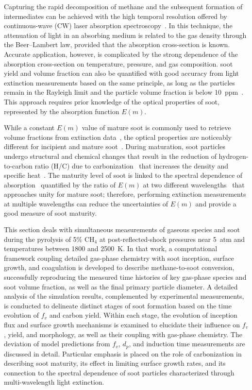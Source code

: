Capturing the rapid decomposition of methane and the subsequent formation of intermediates can be achieved with the high temporal resolution offered by continuous-wave (CW) laser absorption spectroscopy~\citep{pinkowski2019multi}. In this technique, the attenuation of light in an absorbing medium is related to the gas density through the Beer–Lambert law, provided that the absorption cross-section is known. Accurate application, however, is complicated by the strong dependence of the absorption cross-section on temperature, pressure, and gas composition. soot yield and volume fraction can also be quantified with good accuracy from light extinction measurements based on the same principle, as long as the particles remain in the Rayleigh limit and the particle volume fraction is below 10~ppm~\citep{eremin2012formation}. This approach requires prior knowledge of the optical properties of soot, represented by the absorption function $E(m)$. 

While a constant $E(m)$ value of mature soot is commonly used to retrieve volume fractions from extinction data~\citep{de2008scattering, agafonov2016unified, utsav2017simultaneous}, the optical properties are noticeably different for incipient and mature soot~\citep{michelsen2021effects}. During maturation, soot particles undergo structural and chemical changes that result in the reduction of hydrogen-to-carbon ratio (H/C) due to carbonization~\cite{kholghy2016core} that increases the density and specific heat~\citep{michelsen2021effects}. The maturity level of soot is linked to the spectral dependence of absorption~\citep{bescond2016soot} quantified by the ratio of $E(m)$ at two different wavelengths~\citep{yon2021revealing} that approaches unity for mature soot; therefore, performing extinction measurements at multiple wavelengths can reduce the uncertainties of $E(m)$ and provide a good measure of soot maturity.


This section deals with simultaneous measurements of gaseous species and soot during the pyrolysis of 5\% $\mathrm{CH_4}$ at post-reflected-shock pressures near 5~atm and temperatures between 1800 and 2500~K. In that work, a computational framework coupling detailed gas-phase chemistry with soot inception, surface growth, and coagulation is developed to describe methane-to-soot conversion, successfully reproducing the measured time histories of key gas-phase species and soot volume fraction, as well as the final primary particle diameter. A detailed analysis of the simulation results, complemented by experimental measurements, is conducted to delineate distinct stages of soot formation based on the time evolution of $f_v$ and carbon yield. Within each stage, the evolution of inception flux and surface growth mechanisms is examined to elucidate their influence on $f_v$, yield, and morphology, as well as their coupling with gas-phase chemistry. The deviation of model predictions from $f_v$, $d_p$, and induction time measurements are discussed in detail. Particular emphasis is placed on the role of carbonization in describing soot maturity, its effect in limiting surface growth rates, and its connection to the spectral dependence of soot particles characterized through multi-wavelength light extinction.